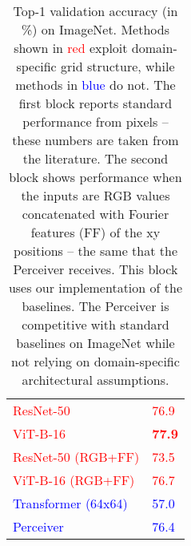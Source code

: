 \documentclass{article}
\begin{document}
\begin{table}[t]
\centering
\begin{tabular}{|l|l|}
\hline
\textcolor{red}{ResNet-50 \cite{he2016deep}}            & \textcolor{red}{76.9}          \\ 
\textcolor{red}{ViT-B-16 \cite{dosovitskiy2020image}}   & \textcolor{red}{\textbf{77.9}} \\ \hline
\textcolor{red}{ResNet-50 (RGB+FF)}                     & \textcolor{red}{73.5}          \\ 
\textcolor{red}{ViT-B-16 (RGB+FF)}                      & \textcolor{red}{76.7}          \\ \hline
\textcolor{blue}{Transformer (64x64)}                    & \textcolor{blue}{57.0}          \\ 
\textcolor{blue}{Perceiver}                              & \textcolor{blue}{76.4}          \\ \hline
\end{tabular}
\caption{Top-1 validation accuracy (in \%) on ImageNet. Methods shown in \textcolor{red}{red} exploit domain-specific grid structure, while methods in \textcolor{blue}{blue} do not. The first block reports standard performance from pixels -- these numbers are taken from the literature. The second block shows performance when the inputs are RGB values concatenated with Fourier features (FF) of the xy positions -- the same that the Perceiver receives. This block uses our implementation of the baselines. The Perceiver is competitive with standard baselines on ImageNet while not relying on domain-specific architectural assumptions.}
\label{tab:imagenet}
\vspace{-10pt}
\end{table}
\end{document}
